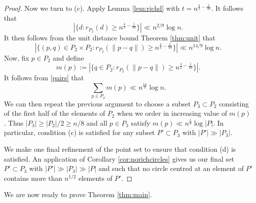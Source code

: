 \documentclass[11pt,oneside]{amsart}
\numberwithin{exercise}{subsection}
\begin{document}
\begin{proof}
Now we turn to (c). Apply Lemma \ref{lem:richd} with $t=n^{\frac{4}{3}-\frac{1}{99}}$. It follows that
\[
|\{d : r_{P_2}(d) \geq n^{\frac{4}{3}-\frac{1}{99}}\}| \ll n^{2/9}\log n.
\]
It then follows from the unit distance bound Theorem \ref{thm:unit} that
\begin{equation} \label{pairs}
|\{(p,q) \in P_2 \times P_2 : r_{P_2}(\|p-q\|) \geq n^{\frac{4}{3}-\frac{1}{99}}\}| \ll n^{14/9}\log n.
\end{equation}
Now, fix $p \in P_2$ and define
\[
m(p):= | \{ q \in P_2 : r_{P_2}(\|p-q\|) \geq n^{\frac{4}{3}-\frac{1}{99}}\}|.
\]
It follows from \eqref{pairs} that 
\[
\sum_{p \in P_2} m(p) \ll n^{\frac{14}{9}}\log n.
\]
We can then repeat the previous argument to choose a subset $P_3 \subset P_2$ consisting of the first half of the elements of $P_2$ when we order in increasing value of $m(p)$. Thus $|P_3| \geq |P_2|/2 \geq n/8$ and all $ p \in P_3$ satisfy $m(p) \ll n^{\frac{5}{9}}\log|P|$. In particular, condition (c) is satisfied for any subset $P' \subset P_3$ with $|P'| \gg |P_3|$.

We make one final refinement of the point set to ensure that condition (d) is satisfied. An application of Corollary \ref{cor:norichcircles} gives us our final set $P' \subset P_3$ with $|P'| \gg |P_3| \gg |P|$ and such that no circle centred at an element of $P'$ contains more than $n^{1/2}$ elements of $P'$.\end{proof}
We are now ready to prove Theorem \ref{thm:main}.
\end{document}
